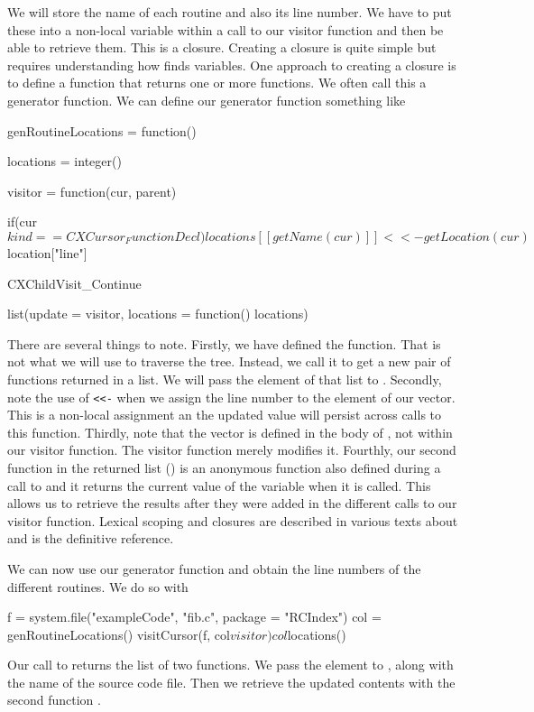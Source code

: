 We will store the name of each routine and also its line number.
We have to put these into a non-local variable within a call to our
visitor  function and then be able to retrieve them. This is a closure.
Creating a closure is quite simple but requires understanding how \R{}
finds variables.  One approach to creating a closure is to define a
function that returns one or more functions.  We often call this a
generator function.
We can define our generator function something like
\begin{RCode}
genRoutineLocations = 
function() 
{
   locations = integer()

    visitor = function(cur, parent) {
       if(cur$kind == CXCursor_FunctionDecl) 
         locations[[ getName(cur) ]] <<- getLocation(cur)$location["line"]

        CXChildVisit_Continue
    }

    list(update = visitor, locations = function() locations)
}
\end{RCode}
There are several things to note.  Firstly, we have defined the
 function. That is not what we will use to
traverse the tree. Instead, we call it to get a new pair of functions
returned in a list.  We will pass the  element of that
list to .  Secondly, note the use of \verb+<<-+
when we assign the line number to the element of our 
vector. This is a non-local assignment an the updated value will
persist across calls to this function. Thirdly, note that the
 vector is defined in the body of
, not within our visitor function. The
visitor function merely modifies it.  Fourthly, our second function in
the returned list () is an anonymous function also
defined during a call to  and it returns
the current value of the  variable when it is called.
This allows us to retrieve the results after they were added in the
different calls to our visitor function.  Lexical scoping and closures
are described in various texts about \R{} and \cite{bib:LexicalScoping}
is the definitive reference.

We can now use our generator function and obtain the line numbers of
the different routines. We do so with
\begin{RCode}
f = system.file("exampleCode", "fib.c", package = "RCIndex")
col = genRoutineLocations()
visitCursor(f, col$visitor)
col$locations()
\end{RCode}
Our call to  returns the list of two
functions.  We pass the  element to ,
along with the name of the source code file.  Then we retrieve the
updated contents with the second function .


